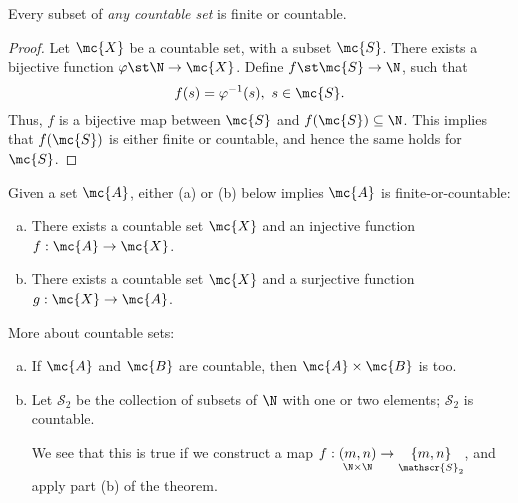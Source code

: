 \begin{property}
	Every subset of \emph{any countable set} is finite or countable.
\end{property}
\begin{proof}
	Let \(\mc{X}\) be a countable set, with a subset \(\mc{S}\). There exists a bijective function \(\varphi\st\N\to \mc{X}\). Define \(f\st\mc{S}\to \N\), such that 
	\begin{equation*}
		f(s)=\varphi^{-1}(s),~s\in \mc{S}.
	\end{equation*}
	Thus, \(f\) is a bijective map between \(\mc{S}\) and \(f(\mc{S})\subseteq \N\). This implies that \(f(\mc{S})\) is either finite or countable, and hence the same holds for \(\mc{S}\).
\end{proof}
\begin{ntheorem}{}
	Given a set \(\mc{A}\), either (a) or (b) below implies \(\mc{A}\) is finite-or-countable:
	\begin{enumerate}[(a)]
		\item There exists a countable set \(\mc{X}\) and an injective function \(f:\mc{A}\to\mc{X}\).
		
		\item There exists a countable set \(\mc{X}\) and a surjective function \(g:\mc{X}\to \mc{A}\).
	\end{enumerate}
\end{ntheorem}
More about countable sets:
\begin{enumerate}[(a)]
	\item If \(\mc{A}\) and \(\mc{B}\) are countable, then \(\mc{A}\times \mc{B}\) is too.
	
	\item Let \(\mathscr{S}_2\) be the collection of subsets of \(\N\) with one or two elements; \(\mathscr{S}_2\) is countable. 
	
	\medskip
	
	We see that this is true if we construct a map \(f:\underset{\N\times\N}{(m,n)}\to\underset{\mathscr{S}_2}{\{m,n\}}\), and apply part (b) of the theorem.
\end{enumerate}